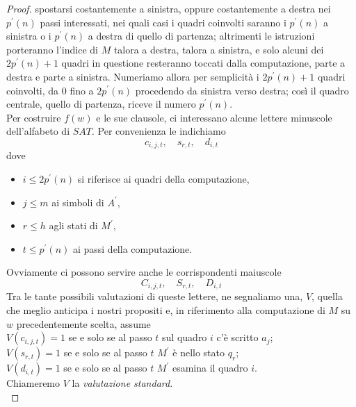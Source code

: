 \begin{proof}
    spostarsi costantemente a sinistra, oppure costantemente a destra nei
    $p^{\prime}(n)$ passi interessati, nei quali casi i quadri coinvolti
    saranno i $p^{\prime}(n)$ a sinistra o i $p^{\prime}(n)$ a destra di
    quello di partenza; altrimenti le istruzioni porteranno l'indice di $M$
    talora a destra, talora a sinistra, e solo alcuni dei $2
        p^{\prime}(n)+1$ quadri in questione resteranno toccati dalla
    computazione, parte a destra e parte a sinistra. Numeriamo allora per
    semplicità i $2 p^{\prime}(n)+1$ quadri coinvolti, da 0 fino a $2
        p^{\prime}(n)$ procedendo da sinistra verso destra; così il quadro
    centrale, quello di partenza, riceve il numero $p^{\prime}(n)$.\\
    Per costruire $f(w)$ e le sue clausole, ci interessano alcune lettere
    minuscole dell'alfabeto di $S A T$. Per convenienza le indichiamo
    $$
        c_{i, j, t}, \quad s_{r, t}, \quad d_{i, t}
    $$
    dove
    \begin{itemize}
        \item $i \leq 2 p^{\prime}(n)$ si riferisce ai quadri della
              computazione,
        \item $j \leq m$ ai simboli di $A^{\prime}$,
        \item $r \leq h$ agli stati di $M^{\prime}$,
        \item $t \leq p^{\prime}(n)$ ai passi della computazione.
    \end{itemize}
    Ovviamente ci possono servire anche le corrispondenti maiuscole
    $$
        C_{i, j, t}, \quad S_{r, t}, \quad D_{i, t}
    $$
    Tra le tante possibili valutazioni di queste lettere, ne segnaliamo una,
    $V$, quella che meglio anticipa i nostri propositi e, in riferimento alla
    computazione di $M$ su $w$ precedentemente scelta, assume\\
    $V\left(c_{i, j, t}\right)=1$ se e solo se al passo $t$ sul quadro $i$ c'è
    scritto $a_j$;\\
    $V\left(s_{r, t}\right)=1$ se e solo se al passo $t$ $M^{\prime}$ è nello
    stato $q_r$;\\
    $V\left(d_{i, t}\right)=1$ se e solo se al passo $t$ $M^{\prime}$ esamina il
    quadro $i$.\\

    Chiameremo $V$ la \textit{valutazione standard}.\\


\end{proof}
